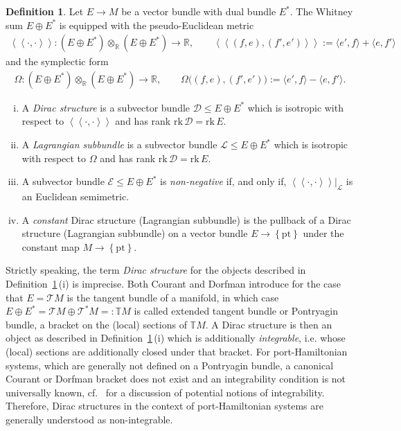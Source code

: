 \documentclass[preprint,12pt]{elsarticle}
\theoremstyle{definition}
\newtheorem{definition}[theorem]{Definition}
\newcommand{\rk}{\mathrm{rk}\,}
\newcommand{\llangle}{\left\langle\!\left\langle}
\newcommand{\rrangle}{\right\rangle\!\right\rangle}
\newcommand{\set}[1]{\left\lbrace #1\right\rbrace}
\begin{document}
\begin{definition}\label{def:underlying_geometry}
Let $E\to M$ be a vector bundle with dual bundle $E^*$. The Whitney sum $E\oplus E^*$ is equipped with the pseudo-Euclidean metric
\begin{align*}
\llangle\cdot,\cdot\rrangle: (E\oplus E^*)\otimes_\mathbb{R}(E\oplus E^*)\to\mathbb{R},\qquad \llangle (f,e),(f',e')\rrangle := \langle e',f\rangle+\langle e,f'\rangle
\end{align*}
and the symplectic form
\begin{align*}
\Omega: (E\oplus E^*)\otimes_\mathbb{R}(E\oplus E^*)\to\mathbb{R},\qquad \Omega\big((f,e),(f',e')\big) := \langle e',f\rangle-\langle e,f'\rangle.
\end{align*}
\begin{enumerate}[(i)]
\item A \textit{Dirac structure} is a subvector bundle $\mathcal{D}\leq E\oplus E^*$ which is isotropic with respect to $\llangle\cdot,\cdot\rrangle$ and has rank $\rk\mathcal{D} = \rk E$.
\item A \textit{Lagrangian subbundle} is a subvector bundle $\mathcal{L}\leq E\oplus E^*$ which is isotropic with respect to $\Omega$ and has rank $\rk\mathcal{D} = \rk E$.
\item A subvector bundle $\mathcal{E}\leq E\oplus E^*$ is \textit{non-negative} if, and only if, $\llangle\cdot,\cdot\rrangle\vert_{\mathcal{L}}$ is an Euclidean semimetric.
\item A \textit{constant} Dirac structure (Lagrangian subbundle) is the pullback of a Dirac structure (Lagrangian subbundle) on a vector bundle $E\to\set{\mathrm{pt}}$ under the constant map $M\to\set{\mathrm{pt}}$.
\end{enumerate}
\end{definition}

Strictly speaking, the term \textit{Dirac structure} for the objects described in Definition~\ref{def:underlying_geometry}\,(i) is imprecise. Both Courant and Dorfman introduce for the case that $E = \mathcal{T}M$ is the tangent bundle of a manifold, in which case $E\oplus E^* = \mathcal{T}M\oplus\mathcal{T}^*M =: \mathbb{T}M$ is called extended tangent bundle or Pontryagin bundle, a bracket on the (local) sections of $\mathbb{T}M$. A Dirac structure is then an object as described in Definition~\ref{def:underlying_geometry}\,(i) which is additionally \textit{integrable}, i.e. whose (local) sections are additionally closed under that bracket. For port-Hamiltonian systems, which are generally not defined on a Pontryagin bundle, a canonical Courant or Dorfman bracket does not exist and an integrability condition is not universally known, cf.~\cite{Merk09} for a discussion of potential notions of integrability. Therefore, Dirac structures in the context of port-Hamiltonian systems are generally understood as non-integrable. 
\end{document}
